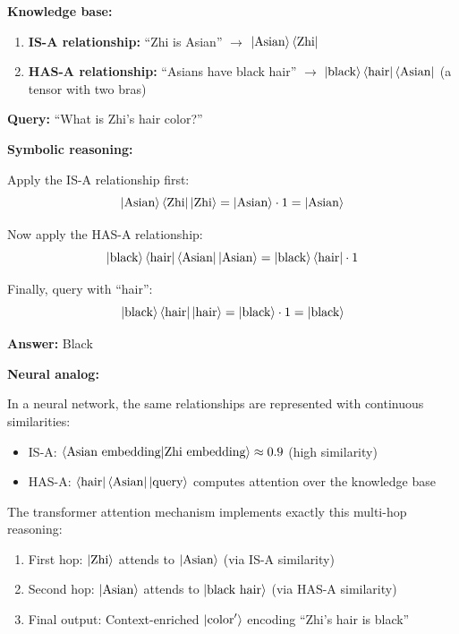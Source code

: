 \documentclass[11pt,a4paper]{article}
\theoremstyle{definition}
\begin{document}
\textbf{Knowledge base:}
\begin{enumerate}
\item \textbf{IS-A relationship:} ``Zhi is Asian'' $\to$ $\ket{\text{Asian}}\bra{\text{Zhi}}$
\item \textbf{HAS-A relationship:} ``Asians have black hair'' $\to$ $\ket{\text{black}}\bra{\text{hair}}\bra{\text{Asian}}$ (a tensor with two bras)
\end{enumerate}

\textbf{Query:} ``What is Zhi's hair color?''

\textbf{Symbolic reasoning:}

Apply the IS-A relationship first:
\begin{equation}
\ket{\text{Asian}}\bra{\text{Zhi}}\ket{\text{Zhi}} = \ket{\text{Asian}} \cdot 1 = \ket{\text{Asian}}
\end{equation}

Now apply the HAS-A relationship:
\begin{equation}
\ket{\text{black}}\bra{\text{hair}}\bra{\text{Asian}}\ket{\text{Asian}} = \ket{\text{black}}\bra{\text{hair}} \cdot 1
\end{equation}

Finally, query with ``hair'':
\begin{equation}
\ket{\text{black}}\bra{\text{hair}}\ket{\text{hair}} = \ket{\text{black}} \cdot 1 = \ket{\text{black}}
\end{equation}

\textbf{Answer:} Black

\textbf{Neural analog:}

In a neural network, the same relationships are represented with continuous similarities:
\begin{itemize}
\item IS-A: $\braket{\text{Asian embedding}|\text{Zhi embedding}} \approx 0.9$ (high similarity)
\item HAS-A: $\bra{\text{hair}}\bra{\text{Asian}}\ket{\text{query}}$ computes attention over the knowledge base
\end{itemize}

The transformer attention mechanism implements exactly this multi-hop reasoning:
\begin{enumerate}
\item First hop: $\ket{\text{Zhi}}$ attends to $\ket{\text{Asian}}$ (via IS-A similarity)
\item Second hop: $\ket{\text{Asian}}$ attends to $\ket{\text{black hair}}$ (via HAS-A similarity)
\item Final output: Context-enriched $\ket{\text{color}'}$ encoding ``Zhi's hair is black''
\end{enumerate}
\end{document}
